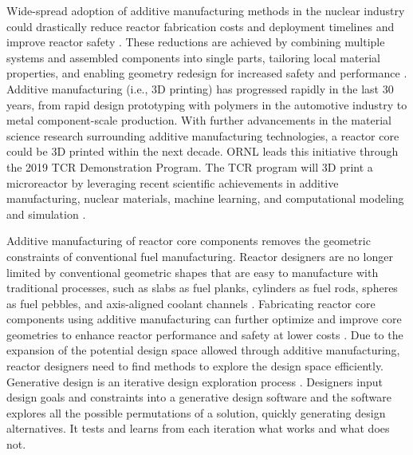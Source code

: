 Wide-spread adoption of additive manufacturing methods in the nuclear industry 
could drastically reduce reactor fabrication costs and deployment timelines 
and improve reactor safety \cite{simpson_considerations_2019}. 
These reductions are achieved by combining multiple systems and assembled 
components into single parts, tailoring local material properties, and 
enabling geometry redesign for increased safety and performance 
\cite{simpson_considerations_2019}. 
Additive manufacturing (i.e., 3D printing) has progressed rapidly in the last 
30 years, from rapid design prototyping with polymers in the automotive industry 
to metal component-scale production. 
With further advancements in the material science research surrounding 
additive manufacturing technologies, a reactor core could be 3D printed within the 
next decade. 
\gls{ORNL} leads this initiative through the 2019 \gls{TCR} Demonstration Program. 
The \gls{TCR} program will 3D print a microreactor by leveraging recent scientific 
achievements in additive manufacturing, nuclear materials, machine learning, and 
computational modeling and simulation \cite{terrani_transformational_2019}.

Additive manufacturing of reactor core components removes the geometric constraints 
of conventional fuel manufacturing. 
Reactor designers are no longer limited by conventional geometric shapes that are easy 
to manufacture with traditional processes, such as slabs as fuel planks, cylinders as 
fuel rods, spheres as fuel pebbles, and axis-aligned coolant channels 
\cite{sobes_artificial_2020}. 
Fabricating reactor core components using additive manufacturing can further optimize 
and improve core geometries to enhance reactor performance and safety at lower costs 
\cite{bergeron_early_2018}.
Due to the expansion of the potential design space allowed through additive 
manufacturing, reactor designers need to find methods to explore the design space 
efficiently. 
Generative design is an iterative design exploration process 
\cite{autodesk_autodesk_2020}. 
Designers input design goals and constraints into a generative design software and 
the software explores all the possible permutations of a solution, quickly generating 
design alternatives. 
It tests and learns from each iteration what works and what does not. 

